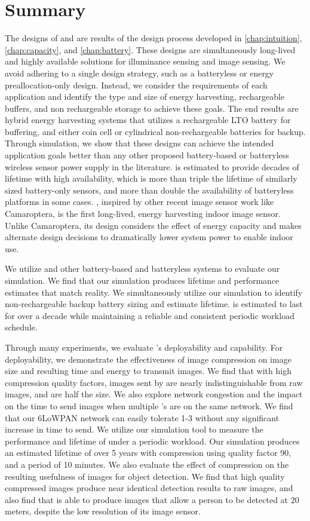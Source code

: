 \section{Summary}
The designs of \name and \namec are results of the design process developed in \cref{chap:intuition}, \cref{chap:capacity}, and \cref{chap:battery}. These designs are simultaneously long-lived and highly available solutions for illuminance sensing and image sensing.
We avoid adhering to a single design strategy, such as a batteryless or energy preallocation-only design.
Instead, we consider the requirements of each application and identify the type and size of energy harvesting, rechargeable buffers, and non rechargeable storage to achieve these goals.
The end results are hybrid energy harvesting systems that utilizes a rechargeable LTO battery for buffering, and either coin cell or cylindrical non-rechargeable batteries for backup.
Through simulation, we show that these designs can achieve the intended application goals better than any other proposed battery-based or batteryless wireless sensor power supply in the literature.
\name is estimated to provide decades of lifetime with high availability, which is more than triple the lifetime of similarly sized battery-only sensors, and more than double the availability of batteryless platforms in some cases.
\namec, inspired by other recent image sensor work like Camaroptera, is the first long-lived, energy harvesting indoor image sensor. Unlike Camaroptera, its design considers the effect of energy capacity and makes alternate design decisions to dramatically lower system power to enable indoor use.

We utilize \name and other battery-based and batteryless systems to evaluate our simulation. We find that our simulation produces lifetime and performance estimates that match reality. We simultaneously utilize our simulation to identify non-rechargeable backup battery sizing and estimate lifetime. \name is estimated to last for over a decade while maintaining a reliable and consistent periodic workload schedule.

Through many experiments, we evaluate \namec's deployability and capability. For deployability, we demonstrate the effectiveness of image compression on image size and resulting time and energy to transmit images. 
We find that with high compression quality factors, images sent by \namec are nearly indistinguishable from raw images, and are half the size. 
We also explore network congestion and the impact on the time to send images when multiple \namec{}'s are on the same network. 
We find that our 6LoWPAN network can easily tolerate 1-3 \namecs without any significant increase in time to send. 
We utilize our simulation tool to measure the performance and lifetime of \namec under a periodic workload.
Our simulation produces an estimated lifetime of over 5 years with compression using quality factor 90, and a period of 10 minutes. 
We also evaluate the effect of compression on the resulting usefulness of images for object detection. 
We find that high quality compressed images produce near identical detection results to raw images, and also find that \namec is able to produce images that allow a person to be detected at 20 meters, despite the low resolution of its image sensor.

